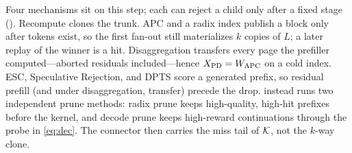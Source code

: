 Four mechanisms sit on this step; each can reject a child only after a fixed stage ().
Recompute clones the trunk.
APC and a radix index publish a block only after tokens exist, so the first fan-out still materializes $k$ copies of $L$; a later replay of the winner is a hit.
Disaggregation transfers every page the prefiller computed---aborted residuals included---hence $X_{\mathrm{PD}}=W_{\mathrm{APC}}$ on a cold index.
ESC, Speculative Rejection, and DPTS score a generated prefix, so residual prefill (and under disaggregation, transfer) precede the drop.
\sys instead runs two independent prune methods: radix prune keeps high-quality, high-hit prefixes before the kernel, and decode prune keeps high-reward continuations through the probe in \eqref{eq:dec}.
The connector then carries the miss tail of $\mathcal{K}$, not the $k$-way clone.

